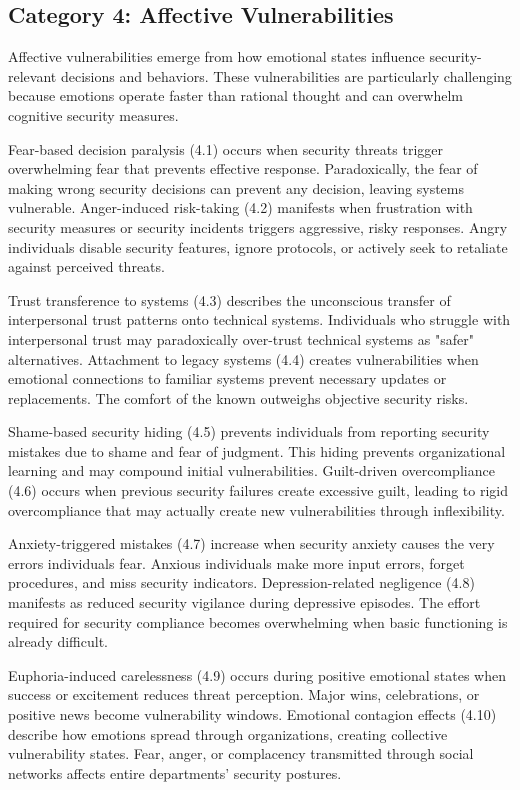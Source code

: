 \documentclass[manuscript,screen,review]{acmart}
\begin{document}
\subsection{Category 4: Affective Vulnerabilities}

Affective vulnerabilities emerge from how emotional states influence security-relevant decisions and behaviors. These vulnerabilities are particularly challenging because emotions operate faster than rational thought and can overwhelm cognitive security measures.

Fear-based decision paralysis (4.1) occurs when security threats trigger overwhelming fear that prevents effective response. Paradoxically, the fear of making wrong security decisions can prevent any decision, leaving systems vulnerable. Anger-induced risk-taking (4.2) manifests when frustration with security measures or security incidents triggers aggressive, risky responses. Angry individuals disable security features, ignore protocols, or actively seek to retaliate against perceived threats.

Trust transference to systems (4.3) describes the unconscious transfer of interpersonal trust patterns onto technical systems. Individuals who struggle with interpersonal trust may paradoxically over-trust technical systems as "safer" alternatives. Attachment to legacy systems (4.4) creates vulnerabilities when emotional connections to familiar systems prevent necessary updates or replacements. The comfort of the known outweighs objective security risks.

Shame-based security hiding (4.5) prevents individuals from reporting security mistakes due to shame and fear of judgment. This hiding prevents organizational learning and may compound initial vulnerabilities. Guilt-driven overcompliance (4.6) occurs when previous security failures create excessive guilt, leading to rigid overcompliance that may actually create new vulnerabilities through inflexibility.

Anxiety-triggered mistakes (4.7) increase when security anxiety causes the very errors individuals fear. Anxious individuals make more input errors, forget procedures, and miss security indicators. Depression-related negligence (4.8) manifests as reduced security vigilance during depressive episodes. The effort required for security compliance becomes overwhelming when basic functioning is already difficult.

Euphoria-induced carelessness (4.9) occurs during positive emotional states when success or excitement reduces threat perception. Major wins, celebrations, or positive news become vulnerability windows. Emotional contagion effects (4.10) describe how emotions spread through organizations, creating collective vulnerability states. Fear, anger, or complacency transmitted through social networks affects entire departments' security postures.
\end{document}
